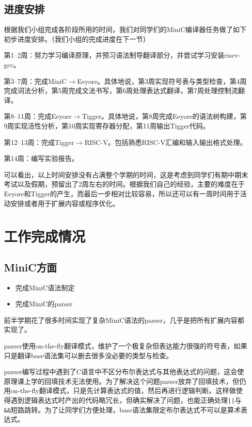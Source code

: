 \documentclass{ctexart}
\begin{document}
\subsection{进度安排}

根据我们小组完成各阶段所用的时间，我们对同学们的MiniC编译器任务做了如下初步进度安排。（我们小组的完成进度在下一节）

第1--2周：努力学习编译原理，并预习语法制导翻译部分，并尝试学习安装riscv-gcc。

第3--7周：完成MiniC$\rightarrow$Eeyore。具体地说，第3周实现符号表与类型检查，第4周完成词法分析，第5周完成文法书写，第6周处理表达式翻译，第7周处理控制流翻译。

第8--11周：完成Eeyore$\rightarrow$Tigger。具体地说，第8周完成Eeyore的语法树构建，第9周实现活性分析，第10周实现寄存器分配，第11周输出Tigger代码。

第12--13周：完成Tigger$\rightarrow$RISC-V。包括熟悉RISC-V汇编和输入输出格式处理。

第14周：编写实验报告。

可以看出，以上时间安排没有占满整个学期的时间，这是考虑到同学们有期中期末考试以及假期，预留出了2周左右的时间。根据我们自己的经验，主要的难度在于Eeyore和Tigger的产生，而最后一步相对比较容易，所以还可以有一周时间用于活动安排或者用于扩展内容或程序优化。

\newpage
\section{工作完成情况}

\subsection{MiniC方面}
\begin{itemize}
	\item 完成MiniC语法制定
	\item 完成MiniC的parser
\end{itemize}

前半学期花了很多时间实现了复杂MiniC语法的parser，几乎是把所有扩展内容都实现了。

parser使用on-the-f\/ly翻译模式，维护了一个极复杂但表达能力很强的符号表，如果只是翻译base语法集可以删去很多没必要的类型与检查。

parser编写过程中遇到了C语言中不区分布尔表达式与其他表达式的问题，这会使原理课上学的回填技术无法使用。为了解决这个问题parser放弃了回填技术，但仍用on-the-f\/ly翻译模式，只是先计算表达式的值，然后再进行逻辑判断。这样做使得遇到逻辑表达式时产出的代码略冗长，但确实解决了问题，也能正确处理\texttt{||}与\texttt{\&\&}短路跳转。为了让同学们方便处理，base语法集限定布尔表达式不可以是算术表达式。
\end{document}

